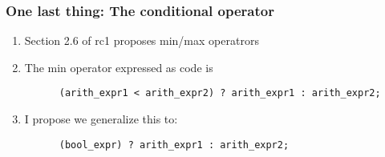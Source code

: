 \documentclass[aspectratio=169]{beamer}
\begin{document}
\begin{frame}[fragile]
  \frametitle{One last thing: The conditional operator}
  \begin{enumerate}
    \item<1-> Section 2.6 of rc1 proposes min/max operatrors
    \item<2-> The min operator expressed as code is
      \begin{verbatim}
      (arith_expr1 < arith_expr2) ? arith_expr1 : arith_expr2;
      \end{verbatim}
    \item<3-> I propose we generalize this to:
      \begin{verbatim}
      (bool_expr) ? arith_expr1 : arith_expr2;
      \end{verbatim}
  \end{enumerate}
\end{frame}
\end{document}
